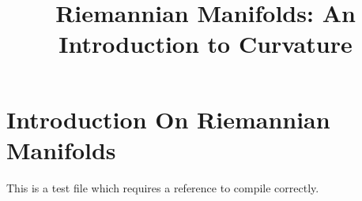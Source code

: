 


%


\title{Riemannian Manifolds: An Introduction to Curvature}


\maketitle

\label{section-phantom}

\tableofcontents

\section{Introduction On Riemannian Manifolds}
\label{section-introduction}

This is a test file which requires a reference to compile correctly. \cite{Maclane}








